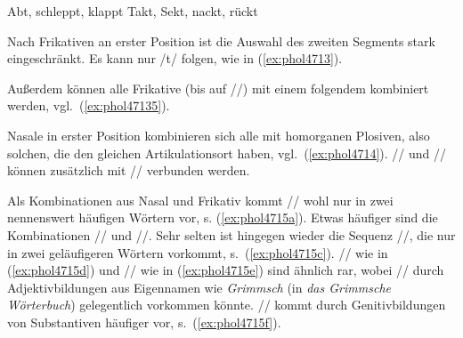 \begin{exe}
  \ex\label{ex:phol4712}
  \begin{xlist}
  	\ex Abt, schleppt, klappt
  	\ex Takt, Sekt, nackt, rückt
  \end{xlist}
\end{exe}

Nach Frikativen an erster Position ist die Auswahl des zweiten Segments stark eingeschränkt.
Es kann nur /t/ folgen, wie in (\ref{ex:phol4713}).

\begin{exe}
\end{exe}

Außerdem können alle Frikative (bis auf //) mit einem folgendem \textipa{[s]} kombiniert werden, vgl.\ (\ref{ex:phol47135}).

\begin{exe}
\end{exe}

Nasale in erster Position kombinieren sich alle mit homorganen Plosiven, also solchen, die den gleichen Artikulationsort haben, vgl.\ (\ref{ex:phol4714}).
// und // können zusätzlich mit // verbunden werden.

\begin{exe}
  \ex\label{ex:phol4714}
  \begin{xlist}
  \end{xlist}
\end{exe}

Als Kombinationen aus Nasal und Frikativ kommt // wohl nur in zwei nennenswert häufigen Wörtern vor, s. (\ref{ex:phol4715a}).
Etwas häufiger sind die Kombinationen // und //.
Sehr selten ist hingegen wieder die Sequenz //, die nur in zwei geläufigeren Wörtern vorkommt, s.\ (\ref{ex:phol4715c}).
// wie in (\ref{ex:phol4715d}) und // wie in (\ref{ex:phol4715e}) sind ähnlich rar, wobei // durch Adjektivbildungen aus Eigennamen wie \textit{Grimmsch} (in \textit{das Grimmsche Wörterbuch}) gelegentlich vorkommen könnte.
// kommt durch Genitivbildungen von Substantiven häufiger vor, s.\ (\ref{ex:phol4715f}).

\begin{exe}
  \ex\label{ex:phol4715}
  \begin{xlist}
  \end{xlist}
\end{exe}

